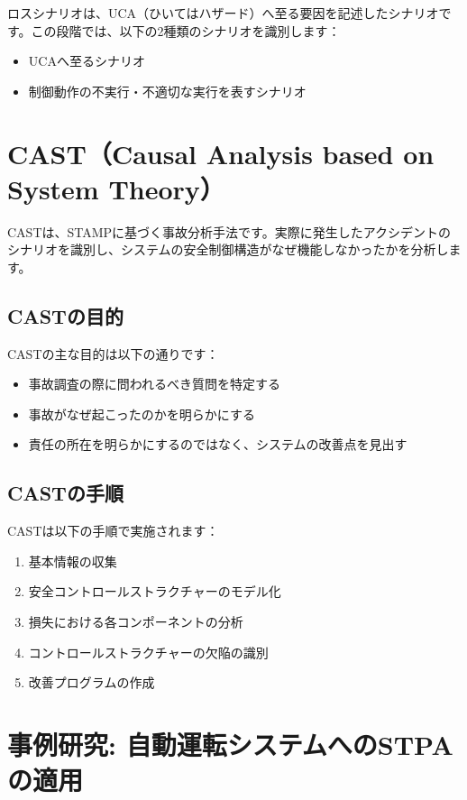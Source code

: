 ロスシナリオは、UCA（ひいてはハザード）へ至る要因を記述したシナリオです。この段階では、以下の2種類のシナリオを識別します：

\begin{itemize}
    \item UCAへ至るシナリオ
    \item 制御動作の不実行・不適切な実行を表すシナリオ
\end{itemize}

\section{CAST（Causal Analysis based on System Theory）}

CASTは、STAMPに基づく事故分析手法です。実際に発生したアクシデントのシナリオを識別し、システムの安全制御構造がなぜ機能しなかったかを分析します。

\subsection{CASTの目的}

CASTの主な目的は以下の通りです：

\begin{itemize}
    \item 事故調査の際に問われるべき質問を特定する
    \item 事故がなぜ起こったのかを明らかにする
    \item 責任の所在を明らかにするのではなく、システムの改善点を見出す
\end{itemize}

\subsection{CASTの手順}

CASTは以下の手順で実施されます：

\begin{enumerate}
    \item 基本情報の収集
    \item 安全コントロールストラクチャーのモデル化
    \item 損失における各コンポーネントの分析
    \item コントロールストラクチャーの欠陥の識別
    \item 改善プログラムの作成
\end{enumerate}

\section{事例研究: 自動運転システムへのSTPAの適用}


